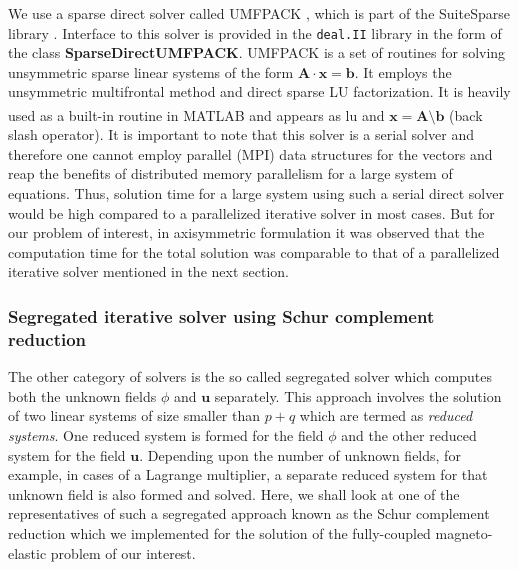 \documentclass[11pt,a4paper,final]{article}
\begin{document}
We use a sparse direct solver called UMFPACK \cite{davis2004algorithm}, which is part of the SuiteSparse library \cite{davis2015suitesparse}. Interface to this solver is provided in the \texttt{deal.II} \cite{Alzetta2018} library in the form of the class \textbf{SparseDirectUMFPACK}. UMFPACK is a set of routines for solving unsymmetric sparse linear systems of the form $\mathbf{A} \cdot \mathbf{x} = \mathbf{b}$. It employs the unsymmetric multifrontal method and direct sparse LU factorization. It is heavily used as a built-in routine in MATLAB\textsuperscript{\tiny\sffamily\textregistered} and appears as lu and $\mathbf{x} = \mathbf{A} \setminus \mathbf{b}$ (back slash operator). It is important to note that this solver is a serial solver and therefore one cannot employ parallel (MPI) data structures for the vectors and reap the benefits of distributed memory parallelism for a large system of equations. Thus, solution time for a large system using such a serial direct solver would be high compared to a parallelized iterative solver in most cases. But for our problem of interest, in axisymmetric formulation it was observed that the computation time for the total solution was comparable to that of a parallelized iterative solver mentioned in the next section.

\subsubsection{Segregated iterative solver using Schur complement reduction}
The other category of solvers is the so called segregated solver which computes both the unknown fields $\phi$ and $\mathbf{u}$ separately. This approach involves the solution of two linear systems of size smaller than $p+q$ which are termed as \textit{reduced systems}. One reduced system is formed for the field $\phi$ and the other reduced system for the field $\mathbf{u}$. Depending upon the number of unknown fields, for example, in cases of a Lagrange multiplier, a separate reduced system for that unknown field is also formed and solved. Here, we shall look at one of the representatives of such a segregated approach known as the Schur complement reduction which we implemented for the solution of the fully-coupled magneto-elastic problem of our interest. \par 
\end{document}
